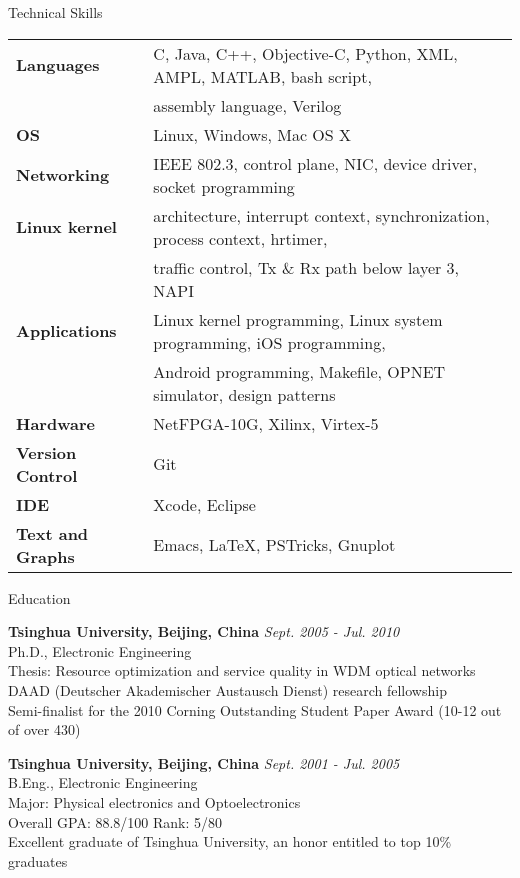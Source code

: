 \documentclass{resume} %
\begin{document}
\begin{rSection}{Technical Skills}

\begin{tabular}{ @{} >{\bfseries}l @{\hspace{6ex}} l }
Languages & C, Java, C++, Objective-C, Python, XML, AMPL, MATLAB, bash script, \\
& assembly language, Verilog \\
OS & Linux, Windows, Mac OS X \\
Networking & IEEE 802.3, control plane, NIC, device driver, socket programming \\
Linux kernel & architecture, interrupt context, synchronization, process context, hrtimer, \\
& traffic control, Tx \& Rx path below layer 3, NAPI \\
Applications & Linux kernel programming, Linux system programming, iOS programming, \\
& Android programming, Makefile, OPNET simulator, design patterns \\
Hardware & NetFPGA-10G, Xilinx, Virtex-5 \\
Version Control & Git \\
IDE & Xcode, Eclipse \\
Text and Graphs & Emacs, \LaTeX, PSTricks, Gnuplot
\end{tabular}

\end{rSection}




\begin{rSection}{Education}

{\bf Tsinghua University, Beijing, China} \hfill {\em Sept. 2005 - Jul. 2010} \\ 
Ph.D., Electronic Engineering \\
Thesis: Resource optimization and service quality in WDM optical networks \\
DAAD (Deutscher Akademischer Austausch Dienst) research fellowship \\
Semi-finalist for the 2010 Corning Outstanding Student Paper Award (10-12 out of over 430)

{\bf Tsinghua University, Beijing, China} \hfill {\em Sept. 2001 - Jul. 2005} \\ 
B.Eng., Electronic Engineering \\
Major: Physical electronics and Optoelectronics \\
Overall GPA: 88.8/100 Rank: 5/80 \\
Excellent graduate of Tsinghua University, an honor entitled to top 10\% graduates

\end{rSection}
\end{document}
